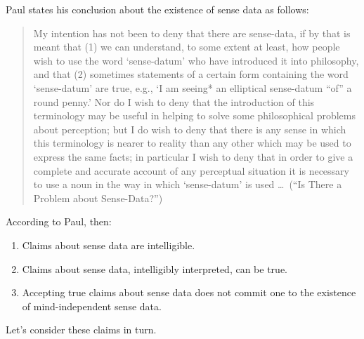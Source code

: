 \documentclass[11pt]{article}
\begin{document}
Paul states his conclusion about the existence of sense data as follows:
\begin{quote}
    My intention has not been to deny that there are sense-data, if by that is meant that (1) we can understand, to some extent at least, how people wish to use the word `sense-datum' who have introduced it into philosophy, and that (2) sometimes statements of a certain form containing the word `sense-datum' are true, e.g., `I am seeing* an elliptical sense-datum ``of'' a round penny.' Nor do I wish to deny that the introduction of this terminology may be useful in helping to solve some philosophical problems about perception; but I do wish to deny that there is any sense in which this terminology is nearer to reality than any other which may be used to express the same facts; in particular I wish to deny that in order to give a complete and accurate account of any perceptual situation it is necessary to use a noun in the way in which `sense-datum' is used \ldots\ (``Is There a Problem about Sense-Data?'')
\end{quote}
According to Paul, then: 
\begin{enumerate}
    \item Claims about sense data are intelligible.
    \item Claims about sense data, intelligibly interpreted, can be true.
    \item Accepting true claims about sense data does not commit one to the existence of mind-independent sense data.
\end{enumerate}
Let's consider these claims in turn.
\end{document}
